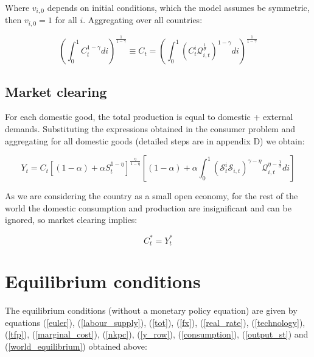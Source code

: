 \documentclass{article}
\begin{document}
Where $v_{i,0}$ depends on initial conditions, which the model assumes be symmetric, then $v_{i,0} = 1$ for all $i$. Aggregating over all countries:

\begin{equation}
    \label{consumption}
    \left(\int^1_0 C_t^{1-\gamma} di \right)^{\frac{1}{1-\gamma}} \equiv C_t = \left(\int^1_0  \left(C_t^i \mathcal Q_{i,t}^{\frac{1}{\sigma}}\right)^{1-\gamma} di \right)^{\frac{1}{1-\gamma}}
\end{equation}


\subsection{Market clearing}
For each domestic good, the total production is equal to domestic + external demands. Substituting the expressions obtained in the consumer problem and aggregating for all domestic goods (detailed steps are in appendix D) we obtain:

\begin{equation}
    \label{output_st}
    Y_{t} = C_t \left[(1-\alpha) + \alpha S_t^{1-\eta} \right]^{\frac{\eta}{1-\eta}} \left[(1-\alpha)  +  \alpha \int_0^1 \left(\mathcal S^i_t \mathcal S_{i,t} \right)^{\gamma - \eta} \mathcal Q^{\eta - \frac{1}{\sigma}}_{i,t} di \right] 
\end{equation}



As we are considering the country as a small open economy, for the rest of the world the domestic consumption and production are insignificant and can be ignored, so market clearing implies:

\begin{equation}
    \label{world_equilibrium}
    C_t^* = Y_t^*
\end{equation}

\section{Equilibrium conditions}
The equilibrium conditions (without a monetary policy equation) are given by equations (\ref{euler}), (\ref{labour_supply}), (\ref{tot}), (\ref{fx}), (\ref{real_rate}), (\ref{technology}), (\ref{tfp}), (\ref{marginal_cost}), (\ref{nkpc}), (\ref{y_row}), (\ref{consumption}), (\ref{output_st}) and (\ref{world_equilibrium}) obtained above:
\end{document}
